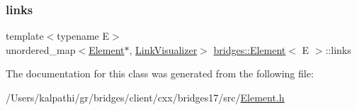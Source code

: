 \subsubsection{\texorpdfstring{links}{links}}
{\footnotesize\ttfamily template$<$typename E$>$ \\
unordered\+\_\+map$<$\mbox{\hyperlink{classbridges_1_1_element}{Element}}$\ast$, \mbox{\hyperlink{classbridges_1_1_link_visualizer}{Link\+Visualizer}}$>$ \mbox{\hyperlink{classbridges_1_1_element}{bridges\+::\+Element}}$<$ E $>$\+::links\hspace{0.3cm}{\ttfamily [protected]}}



The documentation for this class was generated from the following file\+:\begin{DoxyCompactItemize}
\item 
/\+Users/kalpathi/gr/bridges/client/cxx/bridges17/src/\mbox{\hyperlink{_element_8h}{Element.\+h}}\end{DoxyCompactItemize}
